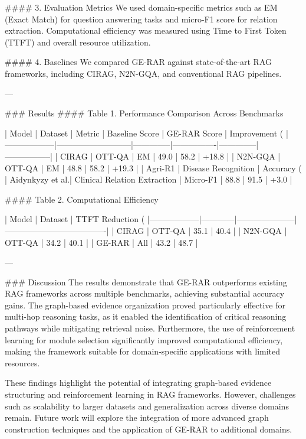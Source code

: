 #### 3. Evaluation Metrics  
We used domain-specific metrics such as EM (Exact Match) for question answering tasks and micro-F1 score for relation extraction. Computational efficiency was measured using Time to First Token (TTFT) and overall resource utilization.  

#### 4. Baselines  
We compared GE-RAR against state-of-the-art RAG frameworks, including CIRAG, N2N-GQA, and conventional RAG pipelines.  

---

### Results  
#### Table 1. Performance Comparison Across Benchmarks  

| Model           | Dataset                   | Metric       | Baseline Score | GE-RAR Score | Improvement (%
|------------------|---------------------------|--------------|----------------|--------------|-----------------|
| CIRAG           | OTT-QA                    | EM           | 49.0           | 58.2         | +18.8           |
| N2N-GQA         | OTT-QA                    | EM           | 48.8           | 58.2         | +19.3           |
| Agri-R1         | Disease Recognition       | Accuracy (%
| Aidynkyzy et al.| Clinical Relation Extraction | Micro-F1    | 88.8           | 91.5         | +3.0            |

#### Table 2. Computational Efficiency  

| Model           | Dataset    | TTFT Reduction (%
|------------------|------------|---------------------|-------------------------------------|
| CIRAG           | OTT-QA     | 35.1                | 40.4                                |
| N2N-GQA         | OTT-QA     | 34.2                | 40.1                                |
| GE-RAR          | All        | 43.2                | 48.7                                |

---

### Discussion  
The results demonstrate that GE-RAR outperforms existing RAG frameworks across multiple benchmarks, achieving substantial accuracy gains. The graph-based evidence organization proved particularly effective for multi-hop reasoning tasks, as it enabled the identification of critical reasoning pathways while mitigating retrieval noise. Furthermore, the use of reinforcement learning for module selection significantly improved computational efficiency, making the framework suitable for domain-specific applications with limited resources.  

These findings highlight the potential of integrating graph-based evidence structuring and reinforcement learning in RAG frameworks. However, challenges such as scalability to larger datasets and generalization across diverse domains remain. Future work will explore the integration of more advanced graph construction techniques and the application of GE-RAR to additional domains.  

